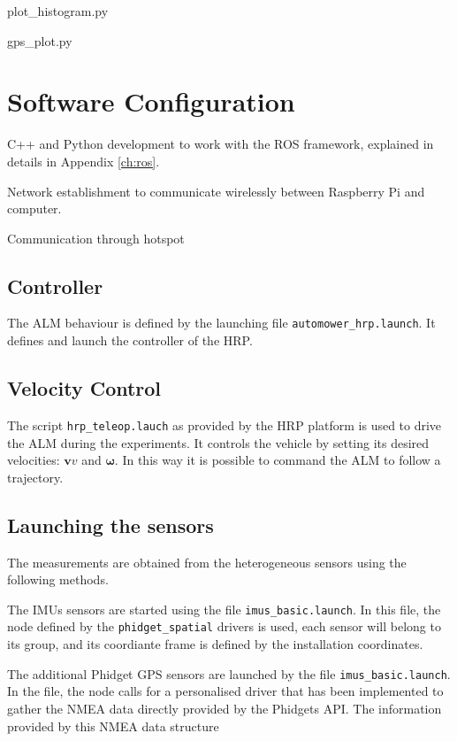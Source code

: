 {plot\_histogram.py

gps\_plot.py


\section{Software Configuration}
\noindent
C++ and Python development to work with the ROS framework, explained in details in Appendix \ref{ch:ros}.

Network establishment to communicate wirelessly between Raspberry Pi and computer.

Communication through hotspot



\subsection{Controller}
\label{sec:driver_safe}
\noindent The \gls{ALM} behaviour is defined by the launching file \texttt{automower\_hrp.launch}.
It defines and launch the controller of the \gls{HRP}.



\subsection{Velocity Control}
\label{sec:control}
\noindent
The script \texttt{hrp\_teleop.lauch} as provided by the \gls{HRP} platform is used to drive the \gls{ALM} during the experiments.
It controls the vehicle by setting its desired velocities: $\mathbf{v}v$ and $\boldsymbol \omega$.
In this way it is possible to command the \gls{ALM} to follow a trajectory.


\subsection{Launching the sensors}
\noindent The measurements are obtained from the heterogeneous sensors using the following methods.


The \glspl{IMU} sensors are started using the file \texttt{imus\_basic.launch}.
In this file, the node defined by the \texttt{phidget\_spatial} drivers is used, each sensor will belong to its group, and its coordiante frame is defined by the installation coordinates.

The additional Phidget \gls{GPS} sensors are launched by the file \texttt{imus\_basic.launch}.
In the file, the node calls for a personalised driver that has been implemented to gather the \gls{NMEA} data directly provided by the Phidgets \gls{API}.
The information provided by this \gls{NMEA} data structure

}
